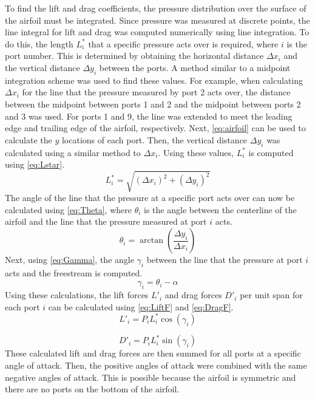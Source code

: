 \documentclass[journal,letterpaper]{IEEEtran}
\begin{document}
To find the lift and drag coefficients, the pressure distribution over the surface of the airfoil must be integrated.
Since pressure was measured at discrete points, the line integral for lift and drag was computed numerically using line integration.
To do this, the length $L_i^*$ that a specific pressure acts over is required, where $i$ is the port number.
This is determined by obtaining the horizontal distance $\Delta x_i$ and the vertical distance $\Delta y_i$ between the ports.
A method similar to a midpoint integration scheme was used to find these values.
For example, when calculating $\Delta x_i$ for the line that the pressure measured by port 2 acts over, the distance between the midpoint between ports 1 and 2 and the midpoint between ports 2 and 3 was used.
For ports 1 and 9, the line was extended to meet the leading edge and trailing edge of the airfoil, respectively.
Next, \eqref{eq:airfoil} can be used to calculate the $y$ locations of each port. Then, the vertical distance $\Delta y_i$ was calculated using a similar method to $\Delta x_i$. Using these values, $L_i^*$ is computed using \eqref{eq:Lstar}.
\begin{equation} \label{eq:Lstar}
    L_i^* = \sqrt{\left(\Delta x_i\right)^2 + \left(\Delta y_i\right)^2}
\end{equation}
The angle of the line that the pressure at a specific port acts over can now be calculated using \eqref{eq:Theta}, where $\theta_i$ is the angle between the centerline of the airfoil and the line that the pressure measured at port $i$ acts.
\begin{equation} \label{eq:Theta}
    \theta_i = \arctan\left(\frac{\Delta y_i}{\Delta x_i}\right)
\end{equation}
Next, using \eqref{eq:Gamma}, the angle $\gamma_i$ between the line that the pressure at port $i$ acts and the freestream is computed.
\begin{equation} \label{eq:Gamma}
    \gamma_i = \theta_i - \alpha
\end{equation}
Using these calculations, the lift forces $L'_i$ and drag forces $D'_i$  per unit span for each port $i$ can be calculated using \eqref{eq:LiftF} and \eqref{eq:DragF}.
\begin{equation} \label{eq:LiftF}
    L'_i = P_i L_i^* \cos\left(\gamma_i\right)
\end{equation}

\begin{equation} \label{eq:DragF}
    D'_i = P_i L_i^* \sin\left(\gamma_i\right)
\end{equation}
These calculated lift and drag forces are then summed for all ports at a specific angle of attack.
Then, the positive angles of attack were combined with the same negative angles of attack.
This is possible because the airfoil is symmetric and there are no ports on the bottom of the airfoil.
\end{document}
